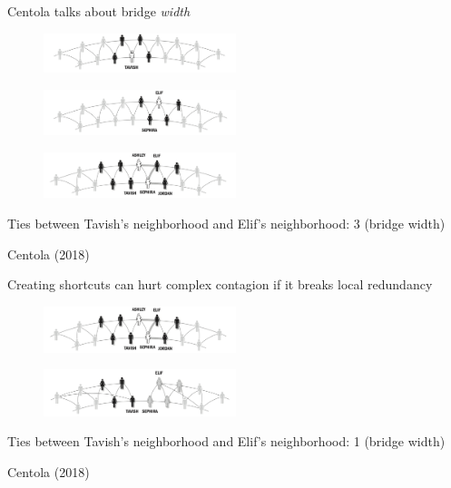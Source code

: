 \documentclass[aspectratio=169]{beamer}
\begin{document}
\begin{frame}

Centola talks about bridge \emph{width}\\

\begin{figure}
\includegraphics[width=0.5\textwidth]{figures/centola_how_2018_fig3_6}
\end{figure}

\pause

\begin{figure}
\includegraphics[width=0.5\textwidth]{figures/centola_how_2018_fig3_7}
\end{figure}

\pause

\begin{figure}
\includegraphics[width=0.5\textwidth]{figures/centola_how_2018_fig3_8}
\end{figure}

\pause

Ties between Tavish's neighborhood and Elif's neighborhood: 3 (bridge width)

\vfill
\tiny{Centola (2018)}
\end{frame}
\begin{frame}

Creating shortcuts can hurt complex contagion if it breaks local redundancy \pause

\begin{figure}
\includegraphics[width=0.5\textwidth]{figures/centola_how_2018_fig3_8}
\end{figure}

\begin{figure}
\includegraphics[width=0.5\textwidth]{figures/centola_how_2018_fig3_9}
\end{figure}

Ties between Tavish's neighborhood and Elif's neighborhood: 1 (bridge width)

\vfill
\tiny{Centola (2018)}
\end{frame}
\end{document}
